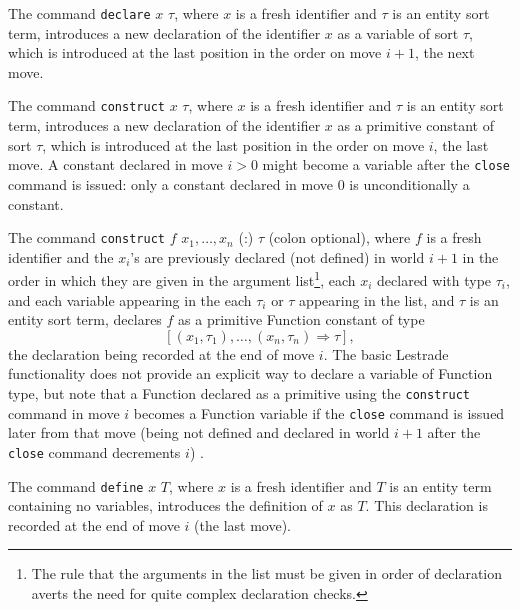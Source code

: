 \documentclass{article}
\begin{document}
The command {\tt declare} $x$ $\tau$, where $x$ is a fresh identifier and $\tau$ is an entity sort term, introduces a new declaration of the identifier $x$
as a variable of sort $\tau$, which is introduced at the last position in the order on move $i+1$, the next move.

The command {\tt construct} $x$ $\tau$, where $x$ is a fresh identifier and $\tau$ is an entity sort term, introduces a new declaration of the identifier
$x$ as a primitive constant of sort $\tau$, which is introduced at the last position in the order on move $i$, the last move.  A constant declared in move $i>0$ might become a variable after the {\tt close} command is issued:  only a constant declared in move 0 is unconditionally a constant.

The command {\tt construct} $f$ $x_1, \ldots,x_n$ (:) $\tau$ (colon optional), where $f$ is a fresh identifier and the $x_i$'s are previously declared (not defined) in world $i+1$ in the order in which they are given in the argument list\footnote{The rule that the arguments in the list must be given in order of declaration averts the need for quite complex declaration checks.}, each $x_i$ declared with type $\tau_i$, and each variable appearing in the each $\tau_i$ or $\tau$ appearing in the list, and $\tau$ is an entity sort term, declares $f$ as a primitive Function constant of type
$$[(x_1,\tau_1),\ldots,(x_n,\tau_n) \Rightarrow \tau],$$ the declaration being recorded at the end of move $i$.  The basic Lestrade functionality does not provide an explicit way to declare a variable of Function type, but note that a Function declared as a primitive using the {\tt construct} command in move $i$ becomes a Function variable if the {\tt close} command is issued later from that move (being not defined and declared in world $i+1$ after the {\tt close} command decrements $i$) .

The command {\tt define} $x$ $T$, where $x$ is a fresh identifier and $T$ is an entity term containing no variables, introduces the definition of $x$ as $T$.  This declaration is recorded at the end of move $i$ (the last move).
\end{document}
